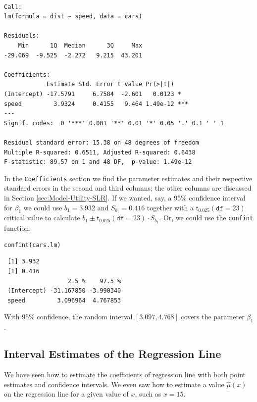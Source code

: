 \documentclass[captions=tableheading]{scrbook}
\begin{document}
\begin{verbatim}
 
Call:
lm(formula = dist ~ speed, data = cars)

Residuals:
    Min      1Q  Median      3Q     Max 
-29.069  -9.525  -2.272   9.215  43.201 

Coefficients:
            Estimate Std. Error t value Pr(>|t|)    
(Intercept) -17.5791     6.7584  -2.601   0.0123 *  
speed         3.9324     0.4155   9.464 1.49e-12 ***
---
Signif. codes:  0 '***' 0.001 '**' 0.01 '*' 0.05 '.' 0.1 ' ' 1 

Residual standard error: 15.38 on 48 degrees of freedom
Multiple R-squared: 0.6511,	Adjusted R-squared: 0.6438 
F-statistic: 89.57 on 1 and 48 DF,  p-value: 1.49e-12
\end{verbatim}

In the \texttt{Coefficients} section we find the parameter estimates and their respective standard errors in the second and third columns; the other columns are discussed in Section \ref{sec:Model-Utility-SLR}. If we wanted, say, a 95\% confidence interval for \(\beta_{1}\) we could use \( b_{1} =  3.932 \) and \( S_{b_{1}} =  0.416 \) together with a \( \mathsf{t}_{0.025}(\mathtt{df}=23) \) critical value to calculate \( b_{1} \pm \mathsf{t}_{0.025}(\mathtt{df} = 23) \cdot S_{b_{1}} \).  Or, we could use the \texttt{confint} function.


\begin{verbatim}
confint(cars.lm)
\end{verbatim}

\begin{verbatim}
 [1] 3.932
 [1] 0.416
                  2.5 %    97.5 %
 (Intercept) -31.167850 -3.990340
 speed         3.096964  4.767853
\end{verbatim}

With 95\% confidence, the random interval \( [  3.097,  4.768 ] \) covers the parameter \(\beta_{1}\).
\subsection{Interval Estimates of the Regression Line}
\label{sec-1-2-5}

\label{sub:slr-interval-est-regline}

We have seen how to estimate the coefficients of regression line with both point estimates and confidence intervals. We even saw how to estimate a value \(\hat{\mu}(x)\) on the regression line for a given value of \(x\), such as \(x=15\). 
\end{document}
